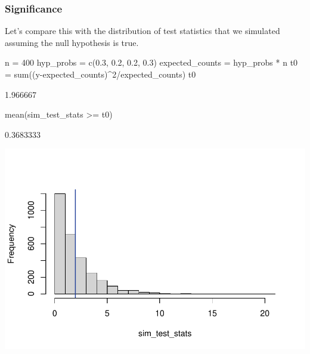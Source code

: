 \documentclass[a4paper]{article}\usepackage[]{graphicx}\usepackage[]{xcolor}
\makeatletter
\def\maxwidth{ %
  \ifdim\Gin@nat@width>\linewidth
    \linewidth
  \else
    \Gin@nat@width
  \fi
}
\makeatother
\begin{document}
\subsubsection{Significance}
Let's compare this with the distribution of test statistics that we simulated assuming the null hypothesis is true.
\begin{Schunk}
\begin{Sinput}
n = 400
hyp_probs = c(0.3, 0.2, 0.2, 0.3)
expected_counts  = hyp_probs * n
t0 = sum((y-expected_counts)^2/expected_counts)
t0
\end{Sinput}
\begin{Soutput}
[1] 1.966667
\end{Soutput}
\begin{Sinput}
mean(sim_test_stats >= t0)
\end{Sinput}
\begin{Soutput}
[1] 0.3683333
\end{Soutput}


{\centering \includegraphics[width=\maxwidth]{figure/listings-unnamed-chunk-28-1} 

}

\end{Schunk}
\end{document}
